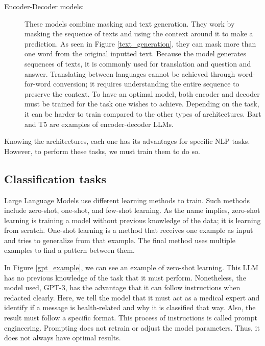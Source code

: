 \begin{description}
\item[Encoder-Decoder models:] These models combine masking and text generation. They work by masking the sequence of texts and using the context around it to make a prediction. As seen in Figure \ref{text_generation}, they can mask more than one word from the original inputted text. Because the model generates sequences of texts, it is commonly used for translation and question and answer. Translating between languages cannot be achieved through word-for-word conversion; it requires understanding the entire sequence to preserve the context. To have an optimal model, both encoder and decoder must be trained for the task one wishes to achieve. Depending on the task, it can be harder to train compared to the other types of architectures. Bart \cite{lewis2019bartdenoisingsequencetosequencepretraining} and T5 \cite{2020t5} are examples of encoder-decoder LLMs.

\end{description}

Knowing the architectures, each one has its advantages for specific NLP tasks. However, to perform these tasks, we must train them to do so.


\subsection{Classification tasks}
Large Language Models use different learning methods to train. Such methods include zero-shot, one-shot, and few-shot learning. As the name implies, zero-shot learning is training a model without previous knowledge of the data; it is learning from scratch. One-shot learning is a method that receives one example as input and tries to generalize from that example. The final method uses multiple examples to find a pattern between them. 

In Figure \ref{gpt_example}, we can see an example of zero-shot learning. This LLM has no previous knowledge of the task that it must perform. Nonetheless, the model used, GPT-3, has the advantage that it can follow instructions when redacted clearly. Here, we tell the model that it must act as a medical expert and identify if a message is health-related and why it is classified that way.  Also, the result must follow a specific format. This process of instructions is called prompt engineering. Prompting does not retrain or adjust the model parameters. Thus, it does not always have optimal results.  
 
